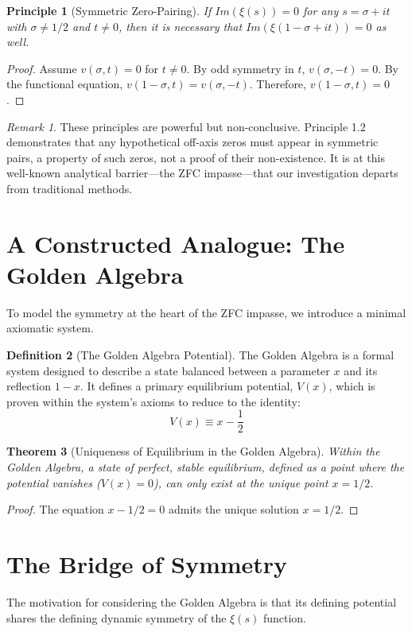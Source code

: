 \documentclass{article}
\theoremstyle{plain}
\newtheorem{theorem}{Theorem}[section]
\newtheorem{principle}[theorem]{Principle}
\theoremstyle{definition}
\newtheorem{definition}[theorem]{Definition}
\theoremstyle{remark}
\newtheorem*{remark}{Remark}
\begin{document}
\begin{principle}[Symmetric Zero-Pairing]
If $Im(\xi(s)) = 0$ for any $s = \sigma + it$ with $\sigma \neq 1/2$ and $t \neq 0$, then it is necessary that $Im(\xi(1-\sigma+it)) = 0$ as well.
\end{principle}
\begin{proof}
Assume $v(\sigma, t) = 0$ for $t \neq 0$. By odd symmetry in $t$, $v(\sigma, -t) = 0$. By the functional equation, $v(1-\sigma, t) = v(\sigma, -t)$. Therefore, $v(1-\sigma, t) = 0$.
\end{proof}

\begin{remark}
These principles are powerful but non-conclusive. Principle 1.2 demonstrates that any hypothetical off-axis zeros must appear in symmetric pairs, a property of such zeros, not a proof of their non-existence. It is at this well-known analytical barrier—the ZFC impasse—that our investigation departs from traditional methods.
\end{remark}


\section{A Constructed Analogue: The Golden Algebra}
To model the symmetry at the heart of the ZFC impasse, we introduce a minimal axiomatic system.

\begin{definition}[The Golden Algebra Potential]
The Golden Algebra is a formal system designed to describe a state balanced between a parameter $x$ and its reflection $1-x$. It defines a primary equilibrium potential, $V(x)$, which is proven within the system's axioms to reduce to the identity:
$$ V(x) \equiv x - \frac{1}{2} $$
\end{definition}

\begin{theorem}[Uniqueness of Equilibrium in the Golden Algebra]
Within the Golden Algebra, a state of perfect, stable equilibrium, defined as a point where the potential vanishes ($V(x) = 0$), can only exist at the unique point $x=1/2$.
\end{theorem}
\begin{proof}
The equation $x - 1/2 = 0$ admits the unique solution $x = 1/2$.
\end{proof}


\section{The Bridge of Symmetry}
The motivation for considering the Golden Algebra is that its defining potential shares the defining dynamic symmetry of the $\xi(s)$ function.
\end{document}

